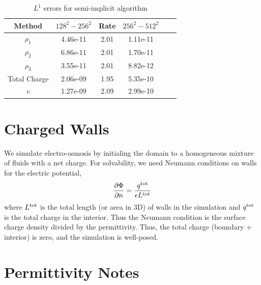 \documentclass[final]{siamltex}
\begin{document}
\begin{table}[htb]
\begin{center}
\caption{$L^1$ errors for semi-implicit algorithm}
\label{tab:semi-implicit convergence}
\begin{tabular}{cccccc}
\\ \hline\hline                                                                 
Method & $128^2-256^2$ & Rate & $256^2-512^2$ \\
\hline\hline
$\rho_1$     & 4.46e-11 & 2.01 & 1.11e-11 \\
$\rho_2$     & 6.86e-11 & 2.01 & 1.70e-11 \\
$\rho_3$     & 3.55e-11 & 2.01 & 8.82e-12 \\
Total Charge & 2.06e-09 & 1.95 & 5.35e-10 \\
$v$          & 1.27e-09 & 2.09 & 2.99e-10 \\
\end{tabular}
\end{center}
\end{table}

\section{Charged Walls}
We simulate electro-osmosis by initialing the domain to a homogeneous mixture of fluids with
a net charge.  For solvability, we need Neumann conditions on walls for the electric
potential,
\begin{equation}
\frac{\partial\Phi}{\partial n} = \frac{q^{\rm tot}}{\epsilon L^{\rm tot}}
\end{equation}
where $L^{\rm tot}$ is the total length (or area in 3D) of walls in the simulation
and $q^{\rm tot}$ is the total charge in the interior.  Thus
the Neumann condition is the surface charge density divided by the permittivity.
Thus, the total charge (boundary + interior) is zero, and the simulation is well-posed.

\section{Permittivity Notes}
\end{document}
